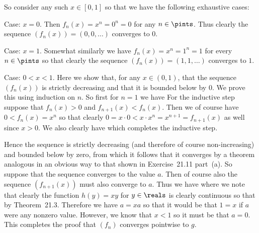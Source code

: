 {{    So consider any such $x \in [0,1]$ so that we have the following exhaustive cases:

    Case: $x = 0$.
    Then $f_n(x) = x^n = 0^n = 0$ for any $n \in \pints$.
    Thus clearly the sequence $(f_n(x)) = (0,0,\ldots)$ converges to $0$.

    Case: $x = 1$.
    Somewhat similarly we have $f_n(x) = x^n = 1^n = 1$ for every $n \in \pints$ so that clearly the sequence $(f_n(x)) = (1,1,\ldots)$ converges to $1$.

    Case: $0 < x < 1$.
    Here we show that, for any $x \in (0,1)$, that the sequence $(f_n(x))$ is strictly decreasing and that it is bounded below by $0$.
    We prove this using induction on $n$.
    So first for $n = 1$ we have
    For the inductive step suppose that $f_n(x) > 0$ and $f_{n+1}(x) < f_n(x)$.
    Then we of course have $0 < f_n(x) = x^n$ so that clearly $0 = x \cdot 0 < x \cdot x^n = x^{n+1} = f_{n+1}(x)$ as well since $x > 0$.
    We also clearly have
    which completes the inductive step.
    
    Hence the sequence is strictly decreasing (and therefore of course non-increasing) and bounded below by zero, from which it follows that it converges by a theorem analogous in an obvious way to that shown in Exercise~21.11 part~(a).
    So suppose that the sequence converges to the value $a$.
    Then of course also the sequence $(f_{n+1}(x))$ must also converge to $a$.
    Thus we have
    where we note that clearly the function $h(y) = xy$ for $y \in \reals$ is clearly continuous so that
    by Theorem~21.3.
    Therefore we have $a = xa$ so that it would be that $1 = x$ if $a$ were any nonzero value.
    However, we know that $x < 1$ so it must be that $a = 0$.
    This completes the proof that $(f_n)$ converges pointwise to $g$.

}}

